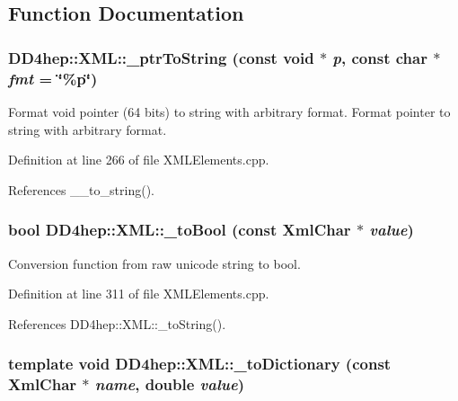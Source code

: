 \subsection{Function Documentation}
\hypertarget{group___d_d4_h_e_p___x_m_l_ga38094fef4f65786fdece09b69b41d07b}{
\subsubsection[{\_\-ptrToString}]{ DD4hep::XML::\_\-ptrToString (const void $\ast$ {\em p}, \/  const char $\ast$ {\em fmt} = {\ttfamily \char`\"{}\%p\char`\"{}})}}
\label{group___d_d4_h_e_p___x_m_l_ga38094fef4f65786fdece09b69b41d07b}


Format void pointer (64 bits) to string with arbitrary format. Format pointer to string with arbitrary format. 

Definition at line 266 of file XMLElements.cpp.

References \_\-\_\-to\_\-string().\hypertarget{group___d_d4_h_e_p___x_m_l_ga4f06ff5f1ca607223cda870587170546}{
\subsubsection[{\_\-toBool}]{\setlength{\rightskip}{0pt plus 5cm}bool DD4hep::XML::\_\-toBool (const XmlChar $\ast$ {\em value})}}
\label{group___d_d4_h_e_p___x_m_l_ga4f06ff5f1ca607223cda870587170546}


Conversion function from raw unicode string to bool. 

Definition at line 311 of file XMLElements.cpp.

References DD4hep::XML::\_\-toString().\hypertarget{group___d_d4_h_e_p___x_m_l_ga7a346eee87fe45320da3ebb2e1958af5}{
\subsubsection[{\_\-toDictionary}]{\setlength{\rightskip}{0pt plus 5cm}template void DD4hep::XML::\_\-toDictionary (const XmlChar $\ast$ {\em name}, \/  double {\em value})}}
\label{group___d_d4_h_e_p___x_m_l_ga7a346eee87fe45320da3ebb2e1958af5}


